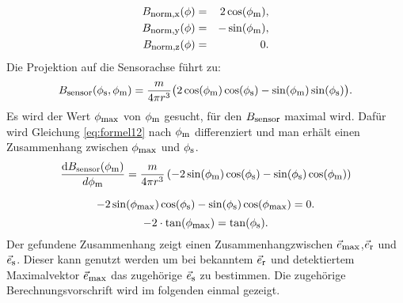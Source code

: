 	\begin{eqnarray}
		B_{\textrm{\footnotesize{norm,x}}}(\phi) &=& 2  \cos(\phi_{\textrm{\footnotesize{m}}}),
		\label{eq:magNorm2DX}\\
		B_{\textrm{\footnotesize{norm,y}}}(\phi) &=& - \sin(\phi_{\textrm{\footnotesize{m}}}),
		\label{eq:magNorm2DY}\\
		B_{\textrm{\footnotesize{norm,z}}}(\phi) &=& 0.
		\label{eq:magNorm2DZ}\\
	\end{eqnarray}
	Die Projektion auf die Sensorachse führt zu:
	\begin{equation}
		B_{\textrm{\footnotesize{sensor}}}(\phi_{\textrm{\footnotesize{s}}},\phi_{\textrm{\footnotesize{m}}})= \frac{ m }{4 \pi r^3} \big( 2  \cos(\phi_{\textrm{\footnotesize{m}}})  \cos(\phi_{\textrm{\footnotesize{s}}}) - \sin(\phi_{\textrm{\footnotesize{m}}})  \sin(\phi_{\textrm{\footnotesize{s}}}) \big).
		\label{eq:formel12}
	\end{equation}
	Es wird der Wert $\phi_{\textrm{\footnotesize{max}}}$ von $\phi_{\textrm{\footnotesize{m}}}$ gesucht, für den $B_{\textrm{\footnotesize{sensor}}}$ maximal wird. Dafür wird Gleichung \ref{eq:formel12} nach $\phi_{\textrm{\footnotesize{m}}}$ differenziert und man erhält einen Zusammenhang zwischen $\phi_{\textrm{\footnotesize{max}}}$ und $\phi_{\textrm{\footnotesize{s}}}$.
	\begin{equation}
		\frac{\text{d}B_\text{sensor}(\phi_{\textrm{\footnotesize{m}}})}{d\phi_{\textrm{\footnotesize{m}}}}=\frac{ m }{4 \pi r^3}\left ( -2 \sin(\phi_{\textrm{\footnotesize{m}}})\cos(\phi_{\textrm{\footnotesize{s}}})-\sin(\phi_{\textrm{\footnotesize{s}}})  \cos(\phi_{\textrm{\footnotesize{m}}})\right )
		\label{eq:formel13}
	\end{equation}

	\begin{equation}
		-2 \sin(\phi_{\textrm{\footnotesize{max}}})\cos(\phi_{\textrm{\footnotesize{s}}})-\sin(\phi_{\textrm{\footnotesize{s}}})  \cos(\phi_{\textrm{\footnotesize{max}}}) = 0.
	\end{equation}
	\begin{equation}
		-2\cdot\tan(\phi_{\textrm{\footnotesize{max}}})= \tan(\phi_{\textrm{\footnotesize{s}}}).
		\label{eq:relMaxS}
	\end{equation}
	Der gefundene Zusammenhang zeigt einen Zusammenhangzwischen $\vec{e}_{\textrm{\footnotesize{max}}}$,$\vec{e}_{\textrm{\footnotesize{r}}}$ und $\vec{e}_{\textrm{\footnotesize{s}}}$. Dieser kann genutzt werden um bei bekanntem $\vec{e}_{\textrm{\footnotesize{r}}}$ und detektiertem Maximalvektor $\vec{e}_{\textrm{\footnotesize{max}}}$ das zugehörige $\vec{e}_{\textrm{\footnotesize{s}}}$ zu bestimmen. Die zugehörige Berechnungsvorschrift wird im folgenden einmal gezeigt.


